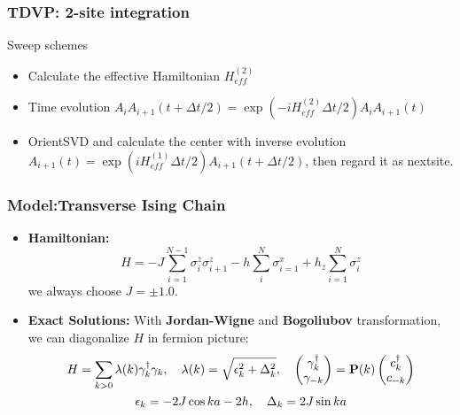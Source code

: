 \documentclass{beamer}
\begin{document}
\begin{frame}
	\frametitle{TDVP: 2-site integration}
	Sweep schemes
	\begin{itemize}
		\item Calculate the effective Hamiltonian $H_{eff}^{(2)}$
		\item Time evolution $A_iA_{i+1}(t+\Delta t/2) = \exp(-iH_{eff}^{(2)}\Delta t / 2)A_iA_{i+1}(t)$ 
		\item OrientSVD and calculate the center with inverse evolution $A_{i+1}(t) = \exp(iH_{eff}^{(1)}\Delta t /2) A_{i+1}(t+\Delta t/2)$, then regard it as nextsite.
		\begin{figure}[H]
			\centering
			\subfigbottomskip=2pt
			\subfigcapskip=-5pt
		\end{figure}
	\end{itemize}
\end{frame}


\begin{frame}
	\frametitle{Model:Transverse Ising Chain}
	\begin{itemize}
		\item \textbf{Hamiltonian:} 
		\begin{equation}
			H = -J\sum_{i=1}^{N-1}\sigma_i^z \sigma_{i+1}^z -h\sum_i^N\sigma_{i=1}^x + h_z\sum_{i=1}^N\sigma_i^z
		\end{equation}
		we always choose $J = \pm 1.0$.
		\item \textbf{Exact Solutions:} With \textbf{Jordan-Wigne} and \textbf{Bogoliubov} transformation, we can diagonalize $H$ in fermion picture:
		\begin{gather}
			H = \sum_{k>0}\lambda(k)\gamma_k^\dagger \gamma_k,\quad \lambda(k) = \sqrt{\epsilon_k^2 + \Delta_k^2},\quad \begin{pmatrix}
				\gamma_k^\dagger\\\gamma_{-k}
				\end{pmatrix} = \vb{P}(k) \begin{pmatrix}
					c_k^\dagger\\c_{-k}
					\end{pmatrix}\\
			\epsilon_k = -2J\cos ka-2h,\quad \Delta_k = 2J\sin ka
		\end{gather}
	\end{itemize}
\end{frame}
\end{document}
